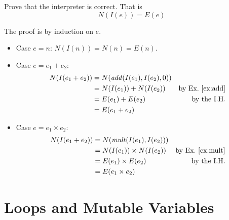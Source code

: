 \documentclass{tufte-handout}
\newcommand{\BR}[1]{(#1)}
\newcommand{\TRUE}[0]{\mathtt{true}}
\newcommand{\FALSE}[0]{\mathtt{false}}
\newcommand{\COND}[3]{#1\,\texttt{?}\,#2\,\texttt{:}\,#3}
\begin{document}
\begin{Exercise}
\label{binary-interp-correct}
 Prove that the interpreter is correct.
 That is
 \[
 N(I\BR{ e }) = E\BR{ e }
 \]
\end{Exercise}
\begin{Answer}
The proof is by induction on $e$.
\begin{itemize}
\item Case $e=n$: 
  $N(I\BR{ n }) = N\BR{ n } = E\BR{ n }$. 
\item Case $e = e_1 + e_2$: 
  \begin{align*}
    N(I\BR{e_1 + e_2}) &= N(\mathit{add}(I\BR{e_1}, I\BR{e_2}, 0)) \\
     & = N(I\BR{e_1}) + N(I\BR{e_2}) & \text{by Ex.~\ref{ex:add}}\\
     & = E\BR{e_1} + E\BR{e_2} & \text{by the I.H.}\\
     & = E\BR{e_1 + e_2}
  \end{align*}

\item Case $e = e_1 \times e_2$: 
  \begin{align*}
    N(I\BR{e_1 + e_2}) &= N(\mathit{mult}(I\BR{e_1}, I\BR{e_2})) \\
     & = N(I\BR{e_1}) \times N(I\BR{e_2}) & \text{by Ex.~\ref{ex:mult}}\\
     & = E\BR{e_1} \times E\BR{e_2} & \text{by the I.H.}\\
     & = E\BR{e_1 \times e_2}
  \end{align*}

\end{itemize}
\end{Answer}





\section{Loops and Mutable Variables}
\label{sec:imp}

\end{document}
